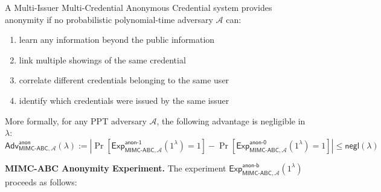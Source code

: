 \newpage
\begin{definition}
A Multi-Issuer Multi-Credential Anonymous Credential system provides anonymity if no probabilistic polynomial-time adversary $\mathcal{A}$ can:

\begin{enumerate}
    \item learn any information beyond the public information
    \item link multiple showings of the same credential
    \item correlate different credentials belonging to the same user
    \item identify which credentials were issued by the same issuer
\end{enumerate}

\noindent More formally, for any PPT adversary $\mathcal{A}$, the following advantage is negligible in $\lambda$:
\[ \mathsf{Adv}^{\mathsf{anon}}_{\mathsf{MIMC\mbox{-}ABC},\mathcal{A}}(\lambda) := |\Pr[\mathsf{Exp}^{\mathsf{anon\mbox{-}1}}_{\mathsf{MIMC\mbox{-}ABC},\mathcal{A}}(1^\lambda) = 1] - \Pr[\mathsf{Exp}^{\mathsf{anon\mbox{-}0}}_{\mathsf{MIMC\mbox{-}ABC},\mathcal{A}}(1^\lambda) = 1]| \leq \mathsf{negl}(\lambda) \]
\end{definition}


\noindent \textbf{MIMC-ABC Anonymity Experiment.} 
The experiment $\mathsf{Exp}^{\mathsf{anon\mbox{-}b}}_{\mathsf{MIMC\mbox{-}ABC},\mathcal{A}}(1^\lambda)$ proceeds as follows:

